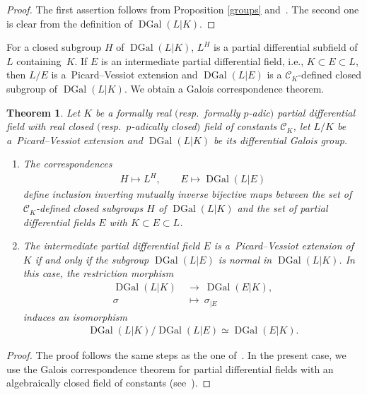 \documentclass[10pt,a4paper]{amsart}
\numberwithin{equation}{section}
\newtheorem{Theorem}{Theorem}[section]
\def \DGal{\operatorname{DGal}}
\begin{document}
\begin{proof} The first assertion follows from Proposition \ref{groups} and~\cite[Proposition~1]{CHSA}. The second one is clear from the definition of $\DGal(L|K)$.
\end{proof}

For a closed subgroup $H$ of $\DGal(L|K)$, $L^H$ is a partial
differential subfield of $L$ containing~$K$. If $E$ is an
intermediate partial differential field, i.e., $K\subset E \subset
L$, then $L/E$ is a~Picard--Vessiot extension and $\DGal(L|E)$
is a $\mathcal{C}_K$-defined closed subgroup of $\DGal(L|K)$. We obtain a Galois correspondence theorem.

\begin{Theorem} Let $K$ be a formally real $($resp.\ formally $p$-adic$)$ partial differential field with real closed $($resp.\ $p$-adically closed$)$ field of constants $\mathcal{C}_K$, let $L/K$ be a~Picard--Vessiot extension and $\DGal(L|K)$ be its differential Galois group.
\begin{enumerate}\itemsep=0pt
\item[$1.$]
The correspondences
\begin{gather*}
H\mapsto L^H , \qquad E\mapsto \DGal(L|E)
\end{gather*}
define inclusion inverting mutually inverse bijective
maps between the set of $\mathcal{C}_K$-defined closed subgroups $H$ of $\DGal(L|K)$
and the set of partial differential fields $E$ with \mbox{$K\!\subset\! E \!\subset\!
L$}.

\item[$2.$] The intermediate partial differential field $E$ is a~Picard--Vessiot extension of $K$ if and only if the subgroup $\DGal(L|E)$ is normal in $\DGal(L|K)$. In this case, the restriction morphism
\begin{align*}
\DGal(L|K)&\ \rightarrow\ \DGal(E|K),
\\
\sigma &\ \mapsto \ \sigma_{|E}
\end{align*}
induces an isomorphism
\begin{gather*}
\DGal(L|K)/\DGal(L|E) \simeq \DGal(E|K).
\end{gather*}
\end{enumerate}
\end{Theorem}

\begin{proof}
The proof follows the same steps as the one of~\cite[Theorem~1]{CHSA}. In the present case, we use the Galois correspondence theorem for partial differential fields with an algebraically closed field of constants (see~\cite[Appendix~D]{PS}).
\end{proof}
\end{document}
